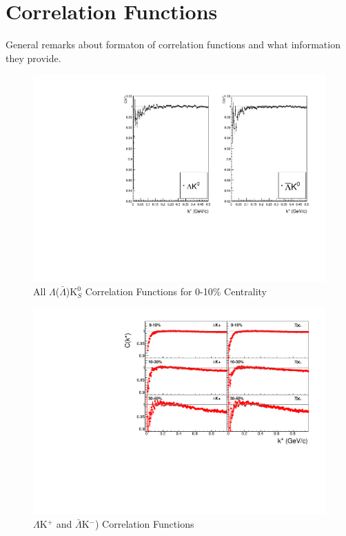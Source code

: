 \documentclass[../AnalysisNoteJBuxton.tex]{subfiles}
\begin{document}
\section{Correlation Functions}
\label{CorrelationFunctions}

General remarks about formaton of correlation functions and what information they provide.

\begin{figure}[h]
  \centering
  \includegraphics[width=\textwidth]{4_CorrelationFunctions/Figures/canKStarCfLamK0_0010.pdf}
  \caption[All $\Lambda$($\bar{\Lambda}$)K$^{0}_{S}$ Correlation Functions]{All $\Lambda$($\bar{\Lambda}$)K$^{0}_{S}$ Correlation Functions for 0-10\% Centrality}
  \label{fig:cLamK0Cfs0010}
\end{figure}

\begin{figure}[h]
  \centering
  \includegraphics[width=\textwidth]{4_CorrelationFunctions/Figures/canKStarCfsLamKchPwConj.pdf}
  \caption[$\Lambda$K$^{+}$ and $\bar{\Lambda}$K$^{-}$ Correlation Functions]{$\Lambda$K$^{+}$ and $\bar{\Lambda}$K$^{-}$) Correlation Functions}
  \label{fig:LamKchPwConjCfs}
\end{figure}
\end{document}
